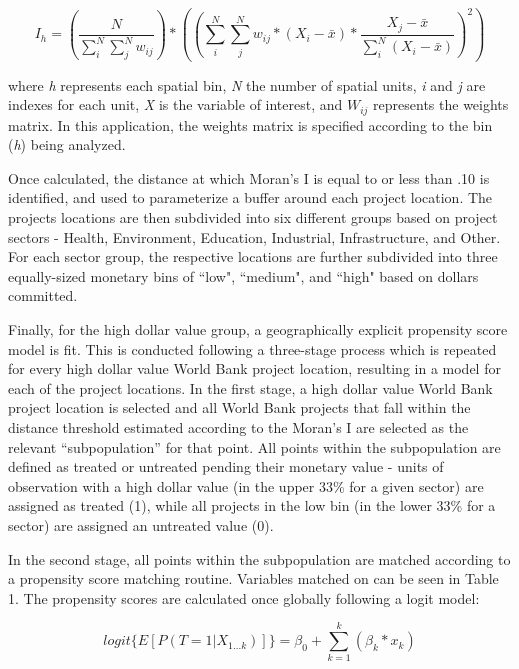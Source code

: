 \documentclass[sustainability,article,submit,moreauthors,pdftex,10pt,a4paper]{mdpi}
\begin{document}
\begin{equation}
I_h = (\frac{N}{\sum_{i}^{N}\sum_{j}^{N}w_{ij}}) * ((\sum_{i}^{N}\sum_{j}^{N}w_{ij} * (X_{i}-\bar{x}) * \frac{X_{j} - \bar{x}}{\sum_{i}^{N}(X_{i}-\bar{x})})^{2})
\label{EQmoran}
\end{equation}

where \textit{h} represents each spatial bin, \textit{N} the number of spatial units, \textit{i} and \textit{j} are indexes for each unit, \textit{X} is the variable of interest, and \begin{math}W_{ij}\end{math} represents the weights matrix. In this application, the weights matrix is specified according to the bin (\textit{h}) being analyzed.  
\par
Once calculated, the distance at which Moran's I is equal to or less than .10 is identified, and used to parameterize a buffer around each project location. The projects locations are then subdivided into six different groups based on project sectors - Health, Environment, Education, Industrial, Infrastructure, and Other. For each sector group, the respective locations are further subdivided into three equally-sized monetary bins of ``low", ``medium", and ``high" based on dollars committed.
\par
Finally, for the high dollar value group, a geographically explicit propensity score model is fit. This is conducted following a three-stage process which is repeated for every high dollar value World Bank project location, resulting in a model for each of the project locations. In the first stage, a high dollar value World Bank project location is selected and all World Bank projects that fall within the distance threshold estimated according to the Moran's I are selected as the relevant ``subpopulation'' for that point. All points within the subpopulation are defined as treated or untreated pending their monetary value - units of observation with a high dollar value (in the upper 33\% for a given sector) are assigned as treated (1), while all projects in the  low bin (in the lower 33\% for a sector) are assigned an untreated value (0).
\par
In the second stage, all points within the subpopulation are matched according to a propensity score matching routine. Variables matched on can be seen in Table 1. The propensity scores are calculated once globally following a logit model:

\begin{equation}
logit \Bigg \{ {E} [P(T=1 | X_{1...k})] \Bigg \}= \beta_{0} + \sum_{k=1}^{k}(\beta_{k}*x_{k})
\label{EQpropensity}
\end{equation}
\end{document}
